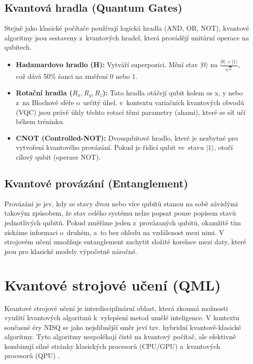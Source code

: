 \documentclass[12pt, a4paper]{report}
\begin{document}
\subsection{Kvantová hradla (Quantum Gates)}
Stejně jako klasické počítače používají logická hradla (AND, OR, NOT), kvantové algoritmy jsou sestaveny z~kvantových hradel, která provádějí unitární operace na qubitech.
\begin{itemize}
    \item \textbf{Hadamardovo hradlo (H):} Vytváří superpozici.
    Mění stav $|0\rangle$ na $\frac{|0\rangle + |1\rangle}{\sqrt{2}}$, což dává 50\% šanci na změření 0 nebo 1.
    \item \textbf{Rotační hradla ($R_x, R_y, R_z$):} Tato hradla otáčejí qubit kolem os x, y nebo z~na Blochově sféře o~určitý úhel.
    v~kontextu variačních kvantových obvodů (VQC) jsou právě úhly těchto rotací těmi parametry (ahami), které se síť učí během tréninku.
    \item \textbf{CNOT (Controlled-NOT):} Dvouqubitové hradlo, které je nezbytné pro vytvoření kvantového provázání.
    Pokud je řídicí qubit ve~stavu $|1\rangle$, otočí cílový qubit (operace NOT).
\end{itemize}

\subsection{Kvantové provázání (Entanglement)}
Provázání je jev, kdy se stavy dvou nebo více qubitů stanou na sobě závislými takovým způsobem, že stav celého systému nelze popsat pouze popisem stavů jednotlivých qubitů.
Pokud změříme jeden z~provázaných qubitů, okamžitě tím získáme informaci o~druhém, a~to bez ohledu na vzdálenost mezi nimi.
V strojovém učení umožňuje entanglement zachytit složité korelace mezi daty, které jsou pro klasické modely výpočetně náročné.

\section{Kvantové strojové učení (QML)} \label{sec:qml}

Kvantové strojové učení je interdisciplinární oblast, která zkoumá možnosti využití kvantových algoritmů k~vylepšení metod umělé inteligence.
V kontextu současné éry NISQ se jako nejslibnější směr jeví tzv. hybridní kvantově-klasické algoritmy.
Tyto algoritmy nespoléhají čistě na kvantový počítač, ale efektivně kombinují silné stránky klasických procesorů (CPU/GPU) a~kvantových procesorů (QPU) \cite{schuld_book}.
\end{document}
